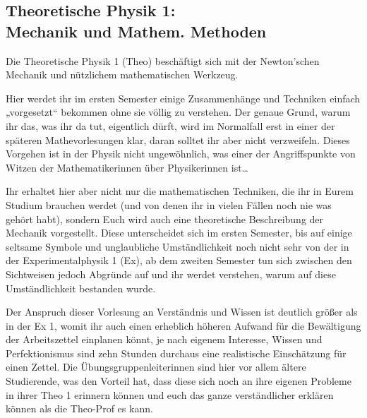 \subsection{Theoretische Physik 1: \\Mechanik und Mathem. Methoden}
\label{theo1}
Die Theoretische Physik 1 (\gls{Theo}) beschäftigt sich mit der Newton'schen Mechanik und nützlichem mathematischen Werkzeug.

Hier werdet ihr im ersten Semester einige Zusammenhänge und Techniken einfach „vorgesetzt“ bekommen ohne sie völlig zu verstehen. Der genaue Grund, warum ihr das, was ihr da tut, eigentlich dürft, wird im Normalfall erst in einer der späteren Mathevorlesungen klar, daran solltet ihr aber nicht verzweifeln. Dieses Vorgehen ist in der Physik nicht ungewöhnlich, was einer der Angriffspunkte von Witzen der Mathematikerinnen über Physikerinnen ist\dots

Ihr erhaltet hier aber nicht nur die mathematischen Techniken, die ihr in Eurem Studium brauchen werdet (und von denen ihr in vielen Fällen noch nie was gehört habt), sondern Euch wird auch eine theoretische Beschreibung der Mechanik vorgestellt. Diese unterscheidet sich im ersten Semester, bis auf einige seltsame Symbole und unglaubliche Umständlichkeit noch nicht sehr von der in der Experimentalphysik 1 (\gls{Ex}), ab dem zweiten Semester tun sich zwischen den Sichtweisen jedoch Abgründe auf und ihr werdet verstehen, warum auf diese Umständlichkeit bestanden wurde.

Der Anspruch dieser Vorlesung an Verständnis und Wissen ist deutlich größer als in der Ex 1, womit ihr auch einen erheblich höheren Aufwand für die Bewältigung der Arbeitszettel einplanen könnt, je nach eigenem Interesse, Wissen und Perfektionismus sind zehn Stunden durchaus eine realistische Einschätzung für einen Zettel. Die Übungsgruppenleiterinnen sind hier vor allem ältere Studierende, was den Vorteil hat, dass diese sich noch an ihre eigenen Probleme in ihrer Theo 1 erinnern können und euch das ganze verständlicher erklären können als die Theo-Prof es kann.

\vfill
\begin{figure}[hbt]
\end{figure}

